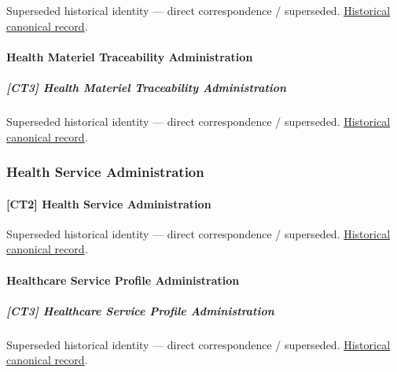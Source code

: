 \par\label{element:9216f9cc905e4526b1d98cd4ab382cbf}
Superseded historical identity — direct correspondence / superseded. \href{../../../../continuum/strategy/capability/9216f9cc905e4526b1d98cd4ab382cbf.md}{Historical canonical record}.\par

\paragraph{Health Materiel Traceability Administration}

\subparagraph{[CT3] Health Materiel Traceability Administration}

\par\label{element:f1b888e8d50c4019ac1afe162d6223f3}
Superseded historical identity — direct correspondence / superseded. \href{../../../../continuum/strategy/capability/f1b888e8d50c4019ac1afe162d6223f3.md}{Historical canonical record}.\par

\subsubsection{Health Service Administration}

\paragraph{[CT2] Health Service Administration}

\par\label{element:f1ab1258cf2944efb50105e7885f8027}
Superseded historical identity — direct correspondence / superseded. \href{../../../../continuum/strategy/capability/f1ab1258cf2944efb50105e7885f8027.md}{Historical canonical record}.\par

\paragraph{Healthcare Service Profile Administration}

\subparagraph{[CT3] Healthcare Service Profile Administration}

\par\label{element:7780ca2fed2346439d5f559d00cc4ee4}
Superseded historical identity — direct correspondence / superseded. \href{../../../../continuum/strategy/capability/7780ca2fed2346439d5f559d00cc4ee4.md}{Historical canonical record}.\par

